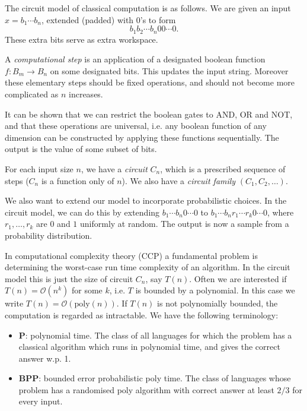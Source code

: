 \documentclass[12pt]{article}
\begin{document}
The circuit model of classical computation is as follows. We are given an input $x = b_1 \cdots b_n$, extended (padded) with $0$'s to form
\[
b_1 b_2 \cdots b_n 0 0 \cdots 0.
\]
These extra bits serve as extra workspace.

A \emph{computational step} is an application of a designated boolean function $f : B_m \to B_n$ on some designated bits. This updates the input string. Moreover these elementary steps should be fixed operations, and should not become more complicated as $n$ increases.


It can be shown that we can restrict the boolean gates to AND, OR and NOT, and that these operations are universal, i.e. any boolean function of any dimension can be constructed by applying these functions sequentially. The output is the value of some subset of bits.

For each input size $n$, we have a \emph{circuit} $C_n$, which is a prescribed sequence of steps ($C_n$ is a function only of $n$). We also have a \emph{circuit family} $(C_1, C_2, \ldots)$.

We also want to extend our model to incorporate probabilistic choices. In the circuit model, we can do this by extending $b_1\cdots b_n 0 \cdots 0$ to $b_1 \cdots b_n r_1 \cdots r_k 0 \cdots 0$, where $r_1, \ldots, r_k$ are $0$ and $1$ uniformly at random. The output is now a sample from a probability distribution.

In computational complexity theory (CCP) a fundamental problem is determining the worst-case run time complexity of an algorithm. In the circuit model this is just the size of circuit $C_n$, say $T(n)$. Often we are interested if $T(n) = \mathcal{O}(n^k)$ for some $k$, i.e. $T$ is bounded by a polynomial. In this case we write $T(n) = \mathcal{O}(\mathrm{poly}(n))$. If $T(n)$ is not polynomially bounded, the computation is regarded as intractable. We have the following terminology:

\begin{itemize}
	\item \textbf{P}: polynomial time. The class of all languages for which the problem has a classical algorithm which runs in polynomial time, and gives the correct answer w.p. 1.
	\item \textbf{BPP}: bounded error probabilistic poly time. The class of languages whose problem has a randomised poly algorithm with correct answer at least $2/3$ for every input.
\end{itemize}
\end{document}
